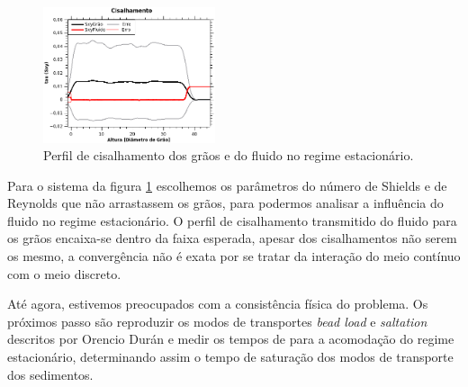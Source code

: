 \begin{figure}
    \centering
    \includegraphics[width = 0.45\textwidth]{04-figuras/Cisalhamento_Fluido_Grao.png}
    \caption{Perfil de cisalhamento dos grãos e do fluido no regime estacionário.}
    \label{fig:Fluido_Grao}
\end{figure}

    Para o sistema da figura \ref{fig:Fluido_Grao} escolhemos os parâmetros do número de Shields e de Reynolds que não arrastassem os grãos, para podermos analisar a influência do fluido no regime estacionário. O perfil de cisalhamento transmitido do fluido para os grãos encaixa-se dentro da faixa esperada, apesar dos cisalhamentos não serem os mesmo, a convergência não é exata por se tratar da interação do meio contínuo com o meio discreto.

    Até agora, estivemos preocupados com a consistência física do problema. Os próximos passo são reproduzir os modos de transportes \textit{bead load} e \textit{saltation} descritos por Orencio Durán \cite{Numerical_simulation_of_turbulent_sediment_transport} e medir os tempos de para a acomodação do regime estacionário, determinando assim o tempo de saturação dos modos de transporte dos sedimentos.
